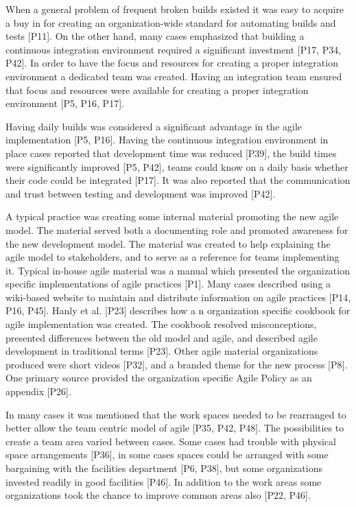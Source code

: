 When a general problem of frequent broken builds existed it was easy to acquire
a buy in for creating an organization-wide standard for automating builds and
tests [P11]. On the other hand, many cases emphasized that building a continuous
integration environment required a significant investment [P17, P34, P42].
In order to have the focus and resources for creating a proper integration
environment a dedicated team was created. Having an integration team ensured
that focus and resources were available for creating a proper integration
environment [P5, P16, P17].

Having daily builds was considered a significant advantage in the agile
implementation [P5, P16]. Having the continuous integration environment in place
cases reported that development time was reduced [P39], the build times were
significantly improved [P5, P42], teams could know on a daily basis whether
their code could be integrated [P17]. It was also reported that the
communication and trust between testing and development was improved [P42].


A typical practice was creating some internal material promoting the new agile
model. The material served both a documenting role and promoted awareness for
the new development model. The material was created to help explaining the agile
model to stakeholders, and to serve as a reference for teams implementing it.
Typical in-house agile material was a manual which presented the organization
specific implementations of agile practices [P1]. Many cases described using a
wiki-based website to maintain and distribute information on agile practices
[P14, P16, P45]. Hanly et al. [P23] describes how a n organization specific
cookbook for agile implementation was created. The cookbook resolved
misconceptions, presented differences between the old model and agile, and
described agile development in traditional terms [P23]. Other agile material
organizations produced were short videos [P32], and a branded theme for the new
process [P8]. One primary source provided the organization specific Agile Policy
as an appendix [P26].


In many cases it was mentioned that the work spaces needed to be rearranged to
better allow the team centric model of agile [P35, P42, P48]. The possibilities
to create a team area varied between cases. Some cases had trouble with physical
space arrangements [P36], in some cases spaces could be arranged with some
bargaining with the facilities department [P6, P38], but some organizations
invested readily in good facilities [P46]. In addition to the work areas some
organizations took the chance to improve common areas also [P22, P46].


